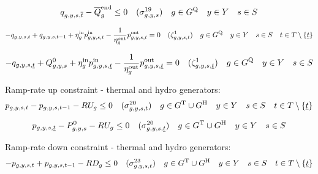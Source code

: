 \documentclass{article}
\newcommand{\sScenarioSets}{\quad  \iYear \in \sYears \quad  \iScenario \in \sScenarios \quad  \iInterval \in \sIntervals}
\begin{document}
\begin{equation}
	\vStorageUnitEnergy[\iGenerator,\iYear,\iScenario,\iIntervalTerminal] - \cStorageUnitEnergyIntervalEndMax \leq  0 \quad (\dMaxStorageEnergyIntervalEnd) \quad  \iGenerator \in \sStorage \quad  \iYear \in \sYears \quad  \iScenario \in \sScenarios
\end{equation}

\begin{equation}
	- \vStorageUnitEnergy + \vStorageUnitEnergy[\iGenerator,\iYear,\iScenario,\iInterval-1] + \cStorageUnitEfficiencyCharging \vPowerIn - \frac{1}{\cStorageUnitEfficiencyDischarging} \vPowerOut = 0 \quad (\dStorageEnergyTransition) \quad  \iGenerator \in \sStorage \sScenarioSets \setminus \{\iIntervalStart\}
\end{equation}

\begin{equation}
	- \vStorageUnitEnergy[\iGenerator,\iYear,\iScenario,\iIntervalStart] + \cStorageEnergyInitial + \cStorageUnitEfficiencyCharging \vPowerIn[\iGenerator,\iYear,\iScenario,\iIntervalStart] - \frac{1}{\cStorageUnitEfficiencyDischarging} \vPowerOut[\iGenerator,\iYear,\iScenario,\iIntervalStart] = 0 \quad (\dStorageEnergyTransition[\iGenerator,\iYear,\iScenario,\iIntervalStart]) \quad  \iGenerator \in \sStorage \quad  \iYear \in \sYears \quad  \iScenario \in \sScenarios
\end{equation}

Ramp-rate up constraint - thermal and hydro generators:
\begin{equation}
	\vPower - \vPower[\iGenerator,\iYear,\iScenario,\iInterval-1] - \cRampRateUp \leq 0 \quad (\dRampRateUp) \quad  \iGenerator \in \sGeneratorsThermal \cup \sGeneratorsHydro \quad  \iYear \in \sYears \quad  \iScenario \in \sScenarios \quad  \iInterval \in \sIntervals \setminus \{\iIntervalStart\}
\end{equation}

\begin{equation}
	\vPower[\iGenerator,\iYear,\iScenario,\iIntervalStart] - \cPowerInitial - \cRampRateUp \leq 0 \quad (\dRampRateUp[\iGenerator,\iYear,\iScenario,\iIntervalStart]) \quad  \iGenerator \in \sGeneratorsThermal \cup \sGeneratorsHydro \quad  \iYear \in \sYears \quad  \iScenario \in \sScenarios
\end{equation}

Ramp-rate down constraint - thermal and hydro generators:
\begin{equation}
	- \vPower + \vPower[\iGenerator,\iYear,\iScenario,\iInterval-1] - \cRampRateDown \leq 0 \quad (\dRampRateDown) \quad  \iGenerator \in \sGeneratorsThermal \cup \sGeneratorsHydro \quad  \iYear \in \sYears \quad  \iScenario \in \sScenarios \quad  \iInterval \in \sIntervals \setminus \{\iIntervalStart\}
\end{equation}
\end{document}
